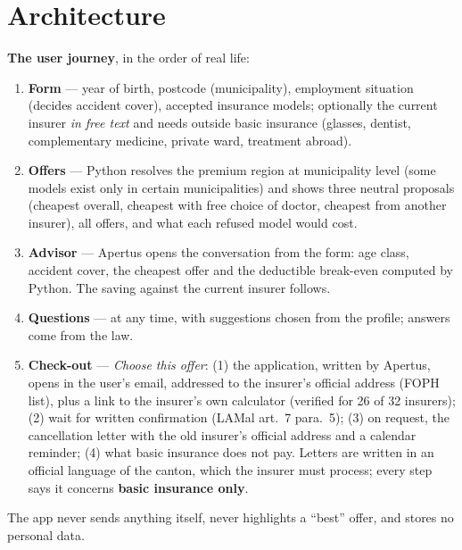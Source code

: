 \documentclass[10pt,a4paper]{article}
\newcommand{\gras}[1]{\textbf{#1}}
\begin{document}
\section{Architecture}

\gras{The user journey}, in the order of real life:
\begin{enumerate}
\item \gras{Form} — year of birth, postcode (municipality), employment situation (decides accident cover), accepted
  insurance models; optionally the current insurer \emph{in free text} and needs outside basic insurance (glasses,
  dentist, complementary medicine, private ward, treatment abroad).
\item \gras{Offers} — Python resolves the premium region at municipality level (some models exist only in certain
  municipalities) and shows three neutral proposals (cheapest overall, cheapest with free choice of doctor,
  cheapest from another insurer), all offers, and what each refused model would cost.
\item \gras{Advisor} — Apertus opens the conversation from the form: age class, accident cover, the cheapest offer
  and the deductible break-even computed by Python. The saving against the current insurer follows.
\item \gras{Questions} — at any time, with suggestions chosen from the profile; answers come from the law.
\item \gras{Check-out} — \emph{Choose this offer}: (1) the application, written by Apertus, opens in the user's email,
  addressed to the insurer's official address (FOPH list), plus a link to the insurer's own calculator (verified
  for 26 of 32 insurers); (2) wait for written confirmation (LAMal art.~7 para.~5); (3) on request, the cancellation
  letter with the old insurer's official address and a calendar reminder; (4) what basic insurance does not pay.
  Letters are written in an official language of the canton, which the insurer must process; every step says it
  concerns \gras{basic insurance only}.
\end{enumerate}
The app never sends anything itself, never highlights a “best” offer, and stores no personal data.
\end{document}
